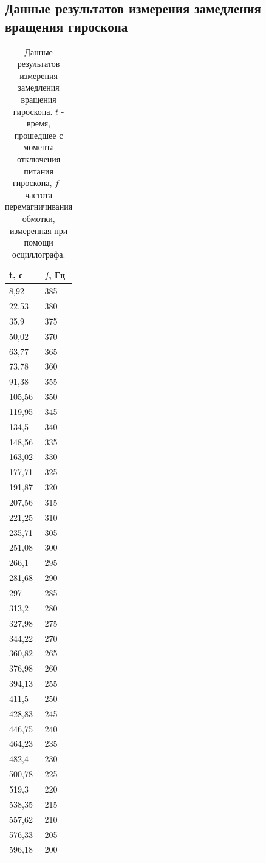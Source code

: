 \documentclass[12pt]{article}
\begin{document}
\subsection{Данные результатов измерения замедления вращения гироскопа} \label{app_3}
\begin{table}[H]
    \centering
    \begin{tabular}{|l|l|}
        \hline
        t, с      & $f$, Гц   \\ 
        \hline
        8,92   & 385 \\
        22,53  & 380 \\ 
        35,9   & 375 \\ 
        50,02  & 370 \\ 
        63,77  & 365 \\ 
        73,78  & 360 \\ 
        91,38  & 355 \\ 
        105,56 & 350 \\
        119,95 & 345 \\
        134,5  & 340 \\ 
        148,56 & 335 \\
        163,02 & 330 \\
        177,71 & 325 \\
        191,87 & 320 \\
        207,56 & 315 \\
        221,25 & 310 \\
        235,71 & 305 \\
        251,08 & 300 \\
        266,1  & 295 \\ 
        281,68 & 290 \\ 
        297    & 285 \\ 
        313,2  & 280 \\ 
        327,98 & 275 \\
        344,22 & 270 \\
        360,82 & 265 \\
        376,98 & 260 \\
        394,13 & 255 \\
        411,5  & 250 \\ 
        428,83 & 245 \\
        446,75 & 240 \\
        464,23 & 235 \\
        482,4  & 230 \\ 
        500,78 & 225 \\
        519,3  & 220 \\ 
        538,35 & 215 \\
        557,62 & 210 \\
        576,33 & 205 \\
        596,18 & 200 \\
        \hline
    \end{tabular}
    
    \caption{Данные результатов измерения замедления вращения гироскопа. $t$ - время, прошедшее с момента отключения питания гироскопа, 
    $f$ - частота перемагничивания обмотки, измеренная при помощи осциллографа.}
    \label{tab:2}
\end{table}
\end{document}
